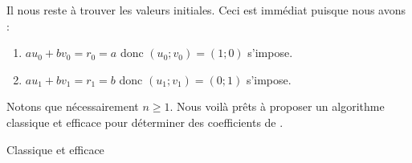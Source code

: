Il nous reste à trouver les valeurs initiales. Ceci est immédiat puisque nous avons :

\begin{enumerate}
	\item $a u_0 + b v_0 = r_0 = a$ donc $(u_0 ; v_0) = (1 ; 0)$ s'impose.

	\item $a u_1 + b v_1 = r_1 = b$ donc $(u_1 ; v_1) = (0 ; 1)$ s'impose.
\end{enumerate}


Notons que nécessairement $n \geq 1$. Nous voilà prêts à proposer un algorithme classique et efficace pour déterminer des coefficients de \bb.


\begin{algo}
	\caption{Classique et efficace} \label{algo-efficient}
	\addalgoblank
\end{algo}
